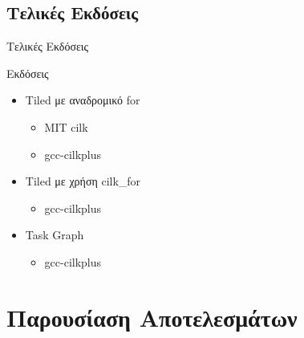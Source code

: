 \documentclass{beamer}
\begin{document}
\subsection{Τελικές Εκδόσεις}
\begin{frame}{Τελικές Εκδόσεις}
    \begin{block}{Εκδόσεις }
        \begin{itemize}
            \item<1-> Tiled με αναδρομικό for
                \begin{itemize}
                    \item<2-> MIT cilk
                    \item<3-> gcc-cilkplus
                \end{itemize}
            \item<4-> Tiled με χρήση cilk\_for
                \begin{itemize}
                    \item<5-> gcc-cilkplus
                \end{itemize}
            \item<6-> Task Graph
                \begin{itemize}
                    \item<7-> gcc-cilkplus
                \end{itemize}
        \end{itemize}
    \end{block}
\end{frame}



\section{Παρουσίαση Αποτελεσμάτων}
\end{document}
